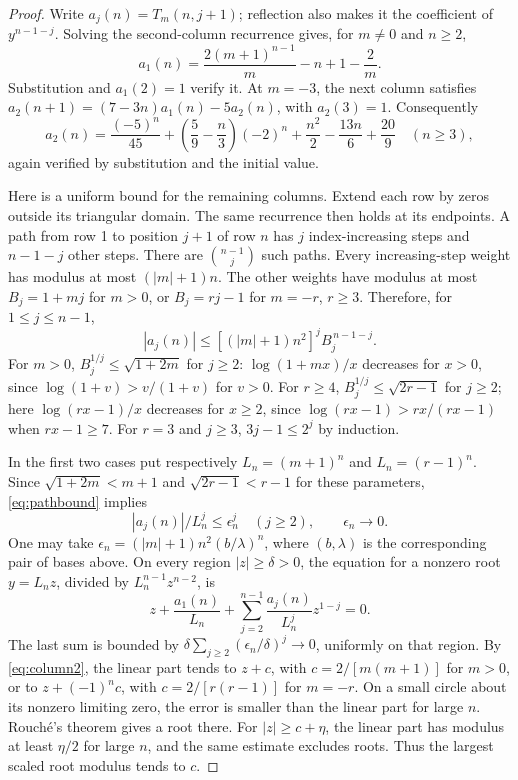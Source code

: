 \begin{proof}
Write $a_j(n)=T_m(n,j+1)$; reflection also makes it the
coefficient of $y^{n-1-j}$. Solving the second-column recurrence
gives, for $m\ne0$ and $n\geq2$,
\begin{equation}\label{eq:column2}
 a_1(n)=\frac{2(m+1)^{n-1}}m-n+1-\frac2m.
\end{equation}
Substitution and $a_1(2)=1$ verify it. At $m=-3$, the next column
satisfies $a_2(n+1)=(7-3n)a_1(n)-5a_2(n)$, with $a_2(3)=1$.
Consequently
\begin{equation}\label{eq:column3}
 a_2(n)=\frac{(-5)^n}{45}
       +\left(\frac59-\frac n3\right)(-2)^n
       +\frac{n^2}2-\frac{13n}6+\frac{20}9
       \quad(n\geq3),
\end{equation}
again verified by substitution and the initial value.

Here is a uniform bound for the remaining columns. Extend each row
by zeros outside its triangular domain. The same recurrence then
holds at its endpoints. A path from row 1 to position $j+1$ of
row $n$ has $j$ index-increasing steps and $n-1-j$ other steps.
There are $\binom{n-1}{j}$ such paths. Every increasing-step weight
has modulus at most $(|m|+1)n$. The other weights have modulus at
most $B_j=1+mj$ for $m>0$, or $B_j=rj-1$ for $m=-r$, $r\geq3$.
Therefore, for $1\leq j\leq n-1$,
\begin{equation}\label{eq:pathbound}
 |a_j(n)|\leq[(|m|+1)n^2]^j B_j^{\,n-1-j}.
\end{equation}
For $m>0$, $B_j^{1/j}\leq\sqrt{1+2m}$ for $j\geq2$:
$\log(1+mx)/x$ decreases for $x>0$, since
$\log(1+v)>v/(1+v)$ for $v>0$.
For $r\geq4$, $B_j^{1/j}\leq\sqrt{2r-1}$ for $j\geq2$;
here $\log(rx-1)/x$ decreases for $x\geq2$, since
$\log(rx-1)>rx/(rx-1)$ when $rx-1\geq7$.
For $r=3$ and $j\geq3$, $3j-1\leq2^j$ by induction.

In the first two cases put respectively $L_n=(m+1)^n$ and
$L_n=(r-1)^n$. Since
$\sqrt{1+2m}<m+1$ and $\sqrt{2r-1}<r-1$ for these parameters,
\eqref{eq:pathbound} implies
\begin{equation}\label{eq:tail}
 |a_j(n)|/L_n^j\leq\epsilon_n^j\quad(j\geq2),
 \qquad \epsilon_n\longrightarrow0.
\end{equation}
One may take $\epsilon_n=(|m|+1)n^2(b/\lambda)^n$,
where $(b,\lambda)$ is the corresponding pair of bases above.
On every region $|z|\geq\delta>0$, the equation for a nonzero
root $y=L_nz$, divided by $L_n^{n-1}z^{n-2}$, is
\[
 z+\frac{a_1(n)}{L_n}
    +\sum_{j=2}^{n-1}\frac{a_j(n)}{L_n^j}z^{1-j}=0.
\]
The last sum is bounded by
$\delta\sum_{j\geq2}(\epsilon_n/\delta)^j\to0$, uniformly on
that region. By \eqref{eq:column2}, the linear part tends to
$z+c$, with $c=2/[m(m+1)]$ for $m>0$, or to
$z+(-1)^nc$, with $c=2/[r(r-1)]$ for $m=-r$.
On a small circle about its nonzero limiting zero, the error is
smaller than the linear part for large $n$.
Rouch\'e's theorem \cite[\S1.10(iv)]{dlmf} gives a root there.
For $|z|\geq c+\eta$, the linear part has modulus at least
$\eta/2$ for large $n$, and the same estimate excludes roots.
Thus the largest scaled root modulus tends to $c$.


\end{proof}
